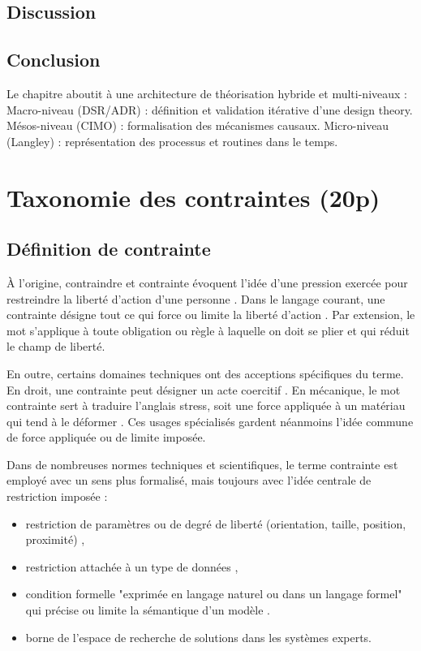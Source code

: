 \documentclass[a4paper,12pt]{article}
\begin{document}
\subsection{Discussion}
\label{sec:orgff9075c}

\subsection{Conclusion}
\label{sec:orga630bca}
Le chapitre aboutit à une architecture de théorisation hybride et multi-niveaux :
Macro-niveau (DSR/ADR) : définition et validation itérative d’une design theory.
Mésos-niveau (CIMO) : formalisation des mécanismes causaux.
Micro-niveau (Langley) : représentation des processus et routines dans le temps.
\clearpage
\section{Taxonomie des contraintes (20p)}
\label{sec:orgcae9582}
\subsection{Définition de contrainte}
\label{sec:org6693969}
À l’origine, contraindre et contrainte évoquent l’idée d’une pression exercée pour restreindre la liberté d’action d’une personne \autocite{CONTRAINTEEtymologieCONTRAINTE}. Dans le langage courant, une contrainte désigne tout ce qui force ou limite la liberté d’action \autocite{DefinitionContrainte}. Par extension, le mot s’applique à toute obligation ou règle à laquelle on doit se plier et qui réduit le champ de liberté.

En outre, certains domaines techniques ont des acceptions spécifiques du terme. En droit, une contrainte peut désigner un acte coercitif \autocite{DefinitionContrainte}. En mécanique, le mot contrainte sert à traduire l’anglais stress, soit une force appliquée à un matériau qui tend à le déformer \autocite{francaiseContrainteDictionnaireLAcademie}. Ces usages spécialisés gardent néanmoins l’idée commune de force appliquée ou de limite imposée.

Dans de nombreuses normes techniques et scientifiques, le terme contrainte est employé avec un sens plus formalisé, mais toujours avec l’idée centrale de restriction imposée : 
\begin{itemize}
\item restriction de paramètres ou de degré de liberté (orientation, taille, position, proximité) \autocite{SpecificationGeometriqueProduits2023},
\item restriction attachée à un type de données \autocite{TechnologiesLinformationVocabulaire2015},
\item condition formelle "exprimée en langage naturel ou dans un langage formel" qui précise ou limite la sémantique d’un modèle  \autocite{NFISO191032024}.
\item borne de l’espace de recherche de solutions \autocite{TechnologiesLinformationVocabulaire2015} dans les systèmes experts.
\end{itemize}
\end{document}
